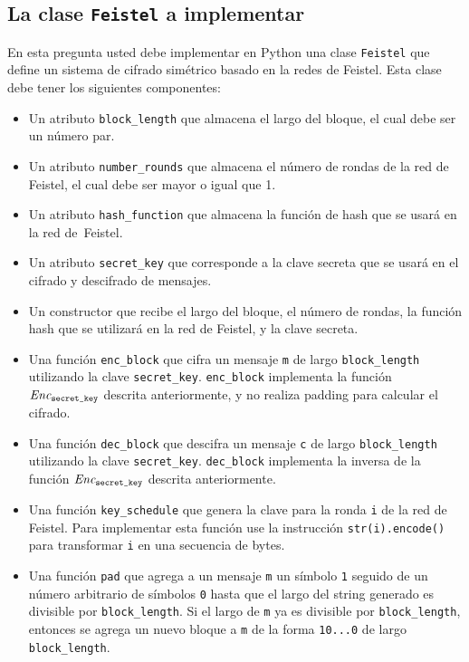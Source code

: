 \subsection*{La clase \texttt{Feistel} a implementar}
En esta pregunta usted debe implementar en Python una clase \texttt{Feistel} que define un sistema de cifrado simétrico basado en la redes de Feistel. Esta clase debe tener los siguientes componentes:
\begin{itemize}
\item Un atributo \texttt{block\_length} que almacena el largo del bloque, el cual debe ser un número par.

\item Un atributo \texttt{number\_rounds} que almacena el número de rondas de la red de Feistel, el cual debe ser mayor o igual que 1.

\item Un atributo \texttt{hash\_function} que almacena la función de hash que se usará en la red de~Feistel.

\item Un atributo \texttt{secret\_key} que corresponde a la clave secreta que se usará en el cifrado y descifrado de mensajes.

\item Un constructor que recibe el largo del bloque, el número de rondas, la función hash que se utilizará en la red de Feistel, y la clave secreta.

\item Una función \texttt{enc\_block} que cifra un mensaje \texttt{m} de largo \texttt{block\_length} utilizando la clave \texttt{secret\_key}. \texttt{enc\_block} implementa la función
  $\textit{Enc}_{\texttt{secret\_key}}$ descrita anteriormente, y no realiza padding para calcular el cifrado.

\item Una función \texttt{dec\_block} que descifra un mensaje \texttt{c} de largo \texttt{block\_length} utilizando la clave \texttt{secret\_key}. \texttt{dec\_block} implementa la
  inversa de la función $\textit{Enc}_{\texttt{secret\_key}}$ descrita anteriormente.

\item Una función \texttt{key\_schedule} que genera la clave para la ronda \texttt{i} de la red de Feistel. Para implementar esta función use la instrucción
\texttt{str(i).encode()} para transformar \texttt{i} en una secuencia de bytes.

\item Una función \texttt{pad} que agrega a un mensaje \texttt{m} un símbolo \texttt{1} seguido de un número arbitrario de símbolos \texttt{0} hasta que el largo del string generado es divisible por \texttt{block\_length}. Si el largo de \texttt{m} ya es divisible por \texttt{block\_length}, entonces se agrega un nuevo bloque a \texttt{m} de la forma \texttt{10...0} de largo \texttt{block\_length}.


\end{itemize}
